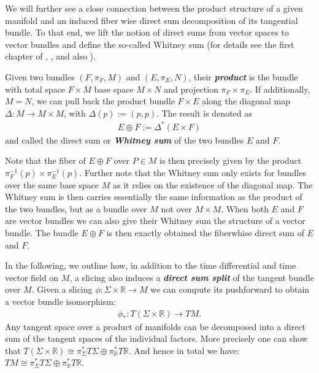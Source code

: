 We will further see a close connection between the product structure of a given manifold and an induced fiber wise direct sum decomposition of its tangential bundle. To that end, we lift the notion of direct sums from vector spaces to vector bundles and define the so-called Whitney sum (for details see the first chapter of \cite{nla.cat-vn705150}, \cite{saunders_1989}, and also \cite{hilton_1952}).
\begin{definition}
Given two bundles $(F, \pi_F, M)$ and $(E, \pi_E, N)$, their \textit{\textbf{product}} is the bundle with total space $F \times M$ base space $M \times N$ and projection $\pi_F \times \pi_E$. If additionally, $M = N$, we can pull back the product bundle $F \times E$ along the diagonal map $\Delta :M \rightarrow M \times M$, with $\Delta(p):= (p,p)$. The result is denoted as
\begin{align}
    E \oplus F := \Delta^{\ast}(E \times F)
\end{align}
and called the direct sum or \textbf{\textit{Whitney sum}} of the two bundles $E$ and $F$. 
\end{definition}
\begin{remark}
Note that the fiber of $E \oplus F$ over $P \in M $ is then precisely given by the product $\pi_F^{-1}(p)\times\pi_{E}^{-1}(p)$. 
Further note that the Whitney sum only exists for bundles over the same base space $M$ as it relies on the existence of the diagonal map. 
The Whitney sum is then carries essentially the same information as the product of the two bundles, but as a bundle over $M$ not over $M \times M$.
When both $E$ and $F$ are vector bundles we can also give their Whitney sum the structure of a vector bundle. The bundle $E \oplus F$ is then exactly obtained the fiberwhise direct sum of $E$ and $F$.  
\end{remark}

In the following, we outline how,
in addition to the time differential and time vector field on $M$, a slicing also induces a \textbf{\textit{direct sum split}} of the tangent bundle over $M$. Given a slicing $\phi : \Sigma \times \mathbb{R} \rightarrow M$ we can compute its pushforward to obtain a vector bundle isomorphism:
\begin{align}
\phi_{\ast}: T(\Sigma \times \mathbb{R}) \longrightarrow TM.
\end{align}
Any tangent space over a product of manifolds can be decomposed into a direct sum of the tangent spaces of the individual factors. More precisely one can show that $T(\Sigma \times \mathbb{R}) \cong \pi_{\Sigma}^{\ast}T\Sigma \oplus \pi_{\mathbb{R}}^{\ast} T\mathbb{R}$. And hence in total we have: $TM \cong \pi_{\Sigma}^{\ast}T\Sigma \oplus \pi_{\mathbb{R}}^{\ast} T\mathbb{R}$.

